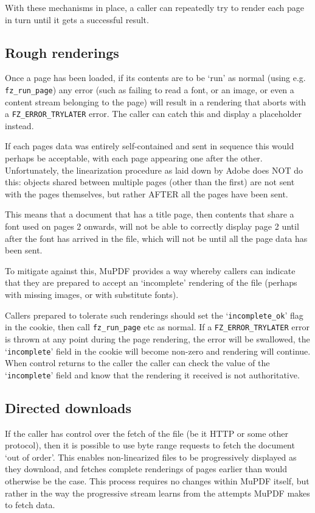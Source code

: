 \documentclass[oneside]{book}
\begin{document}
With these mechanisms in place, a caller can repeatedly try to render each page in turn until it gets a successful result.

\subsection{Rough renderings}

Once a page has been loaded, if its contents are to be `run' as normal (using e.g. \texttt{fz\_run\_page}) any error (such as failing to read a font, or an image, or even a content stream belonging to the page) will result in a rendering that aborts with a \texttt{FZ\_ERROR\_TRYLATER} error. The caller can catch this and display a placeholder instead.

If each pages data was entirely self-contained and sent in sequence this would perhaps be acceptable, with each page appearing one after the other. Unfortunately, the linearization procedure as laid down by Adobe does NOT do this: objects shared between multiple pages (other than the first) are not sent with the pages themselves, but rather AFTER all the pages have been sent.

This means that a document that has a title page, then contents that share a font used on pages 2 onwards, will not be able to correctly display page 2 until after the font has arrived in the file, which will not be until all the page data has been sent.

To mitigate against this, MuPDF provides a way whereby callers can indicate that they are prepared to accept an `incomplete' rendering of the file (perhaps with missing images, or with substitute fonts).

Callers prepared to tolerate such renderings should set the `\texttt{incomplete\_ok}' flag in the cookie, then call \texttt{fz\_run\_page} etc as normal. If a \texttt{FZ\_ERROR\_TRYLATER} error is thrown at any point during the page rendering, the error will be swallowed, the `\texttt{incomplete}' field in the cookie will become non-zero and rendering will continue. When control returns to the caller the caller can check the value of the `\texttt{incomplete}' field and know that the rendering it received is not authoritative.

\subsection{Directed downloads}

If the caller has control over the fetch of the file (be it HTTP or some other protocol), then it is possible to use byte range requests to fetch the document `out of order'. This enables non-linearized files to be progressively displayed as they download, and fetches complete renderings of pages earlier than would otherwise be the case. This process requires no changes within MuPDF itself, but rather in the way the progressive stream learns from the attempts MuPDF makes to fetch data.
\end{document}
